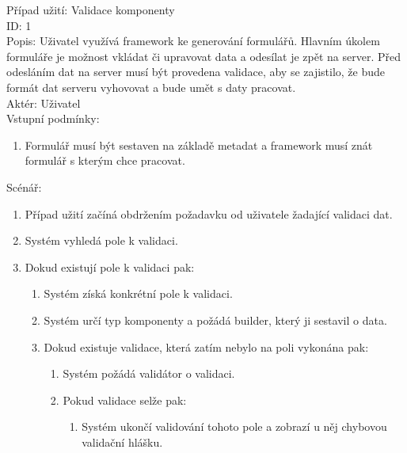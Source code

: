 Případ užití: Validace komponenty\\
ID: 1\\
Popis: 
Uživatel využívá framework ke generování formulářů. Hlavním úkolem formuláře je možnost vkládat či upravovat data a odesílat je zpět na server. Před odesláním dat na server musí být provedena validace, aby se zajistilo, že bude formát dat serveru vyhovovat a bude umět s daty pracovat.
\\
Aktér: Uživatel\\
Vstupní podmínky:
\begin{enumerate}
\item Formulář musí být sestaven na základě metadat a framework musí znát formulář s kterým chce pracovat.
\end{enumerate}
Scénář:
\begin{enumerate}
\item Případ užití začíná obdržením požadavku od uživatele žadající validaci dat.
\item Systém vyhledá pole k validaci.
\item Dokud existují pole k validaci pak:
\begin{enumerate}
\item Systém získá konkrétní pole k validaci.
\item Systém určí typ komponenty a požádá builder, který ji sestavil o data.
\item Dokud existuje validace, která zatím nebylo na poli vykonána pak:
\begin{enumerate}
\item Systém požádá validátor o validaci.
\item Pokud validace selže pak:
\begin{enumerate}
\item Systém ukončí validování tohoto pole a zobrazí u něj chybovou validační hlášku.
\end{enumerate}
\end{enumerate}
\end{enumerate}
\end{enumerate}

